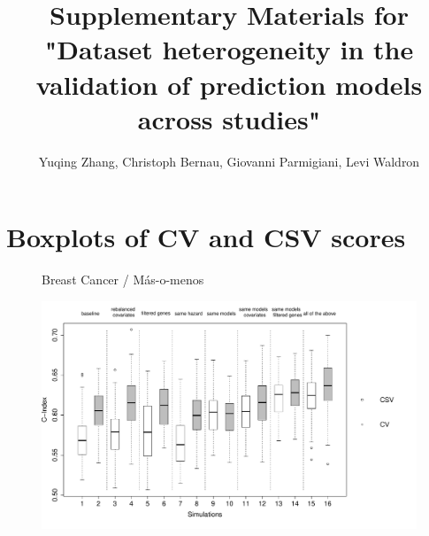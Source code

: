 \documentclass{article}
\title{Supplementary Materials for "Dataset heterogeneity in the validation of prediction models across studies"}
\author{Yuqing Zhang, Christoph Bernau, Giovanni Parmigiani, Levi Waldron}
\date{}
\begin{document}
\maketitle
\tableofcontents
\newpage

%


\section{Boxplots of CV and CSV scores}


\begin{figure}[H]
		\centering            
        	\centerline{Breast Cancer / M\'{a}s-o-menos}
            \includegraphics[width=16cm]{boxplot_breast_masomenos_allpanels.pdf}
   \end{figure}
   
\end{document}

